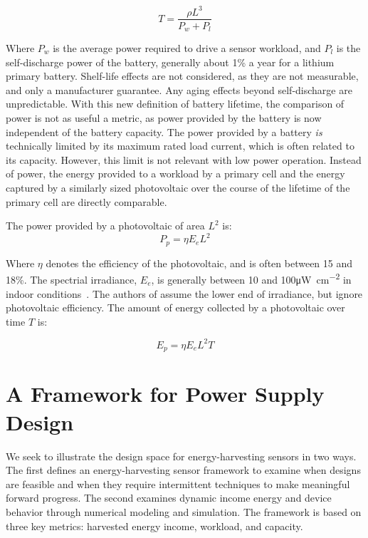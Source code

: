 \begin{equation}
T = \frac{\rho L^3}{P_w + P_l}
\end{equation}

\noindent Where $P_w$ is the average power required to drive a sensor workload, and $P_l$ is the self-discharge power of the battery, generally about 1\% a year for a lithium primary battery. Shelf-life effects are not considered, as they are not measurable, and only a manufacturer guarantee. Any aging effects beyond self-discharge are unpredictable. 
With this new definition of battery lifetime, the comparison of power is not as useful a metric, as power provided by the battery is now independent of the battery capacity. 
The power provided by a battery \textit{is} technically limited by its maximum rated load current, which is often related to its capacity. However, this limit is not relevant with low power operation. 
Instead of power, the energy provided to a workload by a primary cell and the energy captured by a similarly sized photovoltaic over the course of the lifetime of the primary cell are directly comparable.

The power provided by a photovoltaic of area $L^2$ is:
\begin{equation}
P_p = \eta E_e L^2
\end{equation}

\noindent 
Where 
$\eta$ denotes the efficiency of the photovoltaic, and is often between 15 and 18\%. 
The spectrial irradiance, $E_e$, is generally between 10 and 100\si{\micro\watt\per\centi\meter\squared} in indoor conditions~\cite{yervaGrafting12,gorlatova2013networking}. 
The authors of \cite{yervaGrafting12} assume the lower end of irradiance, but ignore photovoltaic efficiency.
The amount of energy collected by a photovoltaic over time $T$ is:

\begin{equation}
E_p = \eta E_e L^2 T
\end{equation}

\section{A Framework for Power Supply Design}
\label{sec:framework}
We seek to illustrate the design space for energy-harvesting sensors in two
ways. The first defines an energy-harvesting sensor framework to examine
when designs are feasible and when they require intermittent techniques to make meaningful forward progress.
The second examines dynamic income energy and device behavior through numerical
modeling and simulation.  The framework is based on three key metrics:
harvested energy income, workload, and capacity.

